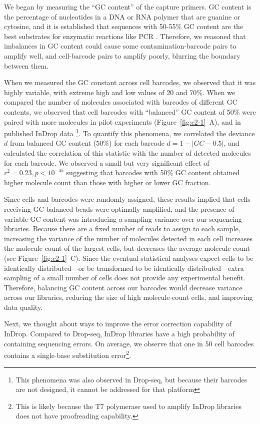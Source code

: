We began by measuring the ``GC content'' of the capture primers. 
GC content is the percentage of nucleotides in a DNA or RNA polymer that are guanine or cytosine, and it is established that sequences with 50-55\% GC content are the best substrates for enzymatic reactions like PCR \citep{Mamedov2008}. 
Therefore, we reasoned that imbalances in GC content could cause some contamination-barcode pairs to amplify well, and cell-barcode pairs to amplify poorly, blurring the boundary between them. 

When we measured the GC constant across cell barcodes, we observed that it was highly variable, with extreme high and low values of 20 and 70\%. 
When we compared the number of molecules associated with barcodes of different GC contents, we observed that cell barcodes with ``balanced'' GC content of 50\% were paired with more molecules in pilot experiments (Figure~\ref{fig:c2-1}~A), and in published InDrop data \citep{Klein2015}\footnote{This phenomena was also observed in Drop-seq, but because their barcodes are not designed, it cannot be addressed for that platform}.
To quantify this phenomena, we correlated the deviance $d$ from balanced GC content ($50\%$) for each barcode $d = 1 - |GC - 0.5|$, and calculated the correlation of this statistic with the number of detected molecules for each barcode. 
We observed a small but very significant effect of $r^{2} = 0.23, p < 10^{-45}$ suggesting that barcodes with 50\% GC content obtained higher molecule count than those with higher or lower GC fraction.

Since cells and barcodes were randomly assigned, these results implied that cells receiving GC-balanced beads were optimally amplified, and the presence of variable GC content was introducing a sampling variance over our sequencing libraries.
Because there are a fixed number of reads to assign to each sample, increasing the variance of the number of molecules detected in each cell increases the molecule count of the largest cells, but decreases the average molecule count (see Figure~\ref{fig:c2-1}~C).
Since the eventual statistical analyses expect cells to be identically distributed---or be transformed to be identically distributed---extra sampling of a small number of cells does not provide any experimental benefit. 
Therefore, balancing GC content across our barcodes would decrease variance across our libraries, reducing the size of high molecule-count cells, and improving data quality. 

Next, we thought about ways to improve the error correction capability of InDrop. 
Compared to Drop-seq, InDrop libraries have a high probability of containing sequencing errors. 
On average, we observe that one in 50 cell barcodes contains a single-base substitution error\footnote{This is likely because the T7 polymerase used to amplify InDrop libraries does not have proofreading capability.}. 

